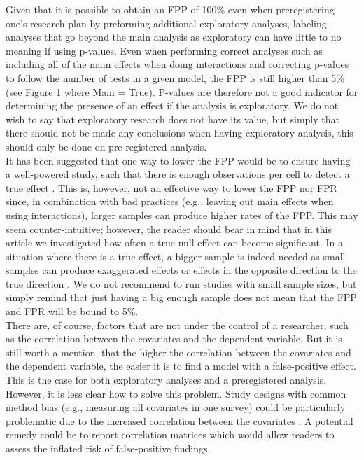 Given that it is possible to obtain an FPP of 100\% even when preregistering one's research plan by preforming additional exploratory analyses, labeling analyses that go beyond the main analysis as exploratory can have little to no meaning if using p-values. Even when performing correct analyses such as including all of the main effects when doing interactions and correcting p-values to follow the number of tests in a given model, the FPP is still higher than 5\% (see Figure 1 where Main = True). P-values are therefore not a good indicator for determining the presence of an effect if the analysis is exploratory. We do not wish to say that exploratory research does not have its value, but simply that there should not be made any conclusions when having exploratory analysis, this should only be done on pre-registered analysis. \\
    
It has been suggested that one way to lower the FPP would be to ensure having a well-powered study, such that there is enough observations per cell to detect a true effect \citep{Simmons2011, simmons2018}. This is, however, not an effective way to lower the FPP nor FPR since, in combination with bad practices (e.g., leaving out main effects when using interactions), larger samples can produce higher rates of the FPP. This may seem counter-intuitive; however, the reader should bear in mind that in this article we investigated how often a true null effect can become significant. In a situation where there is a true effect, a bigger sample is indeed needed as small samples can produce exaggerated effects or effects in the opposite direction to the true direction \citep{gelman2014beyond}. We do not recommend to run studies with small sample sizes, but simply remind that just having a big enough sample does not mean that the FPP and FPR will be bound to 5\%. \\

There are, of course, factors that are not under the control of a researcher, such as the correlation between the covariates and the dependent variable. But it is still worth a mention, that the higher the correlation between the covariates and the dependent variable, the easier it is to find a model with a false-positive effect. This is the case for both exploratory analyses and a preregistered analysis. However, it is less clear how to solve this problem. Study designs with common method bias (e.g., measuring all covariates in one survey) could be particularly problematic due to the increased correlation between the covariates \citep{podsakoff2003}. A potential remedy could be to report correlation matrices which would allow readers to assess the inflated risk of false-positive findings. \\ 

